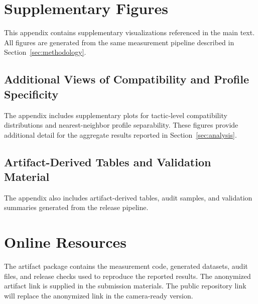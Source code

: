 \documentclass[sigconf,anonymous,review]{acmart}
\begin{document}
\appendix

\section{Supplementary Figures}\label{sec:appendix_supp}

This appendix contains supplementary visualizations referenced in the main text. All figures are generated from the same measurement pipeline described in Section~\ref{sec:methodology}.

\subsection{Additional Views of Compatibility and Profile Specificity}

The appendix includes supplementary plots for tactic-level compatibility distributions and nearest-neighbor profile separability. These figures provide additional detail for the aggregate results reported in Section~\ref{sec:analysis}.

\subsection{Artifact-Derived Tables and Validation Material}

The appendix also includes artifact-derived tables, audit samples, and validation summaries generated from the release pipeline.

\section{Online Resources}

The artifact package contains the measurement code, generated datasets, audit files, and release checks used to reproduce the reported results. The anonymized artifact link is supplied in the submission materials. The public repository link will replace the anonymized link in the camera-ready version.
\end{document}
